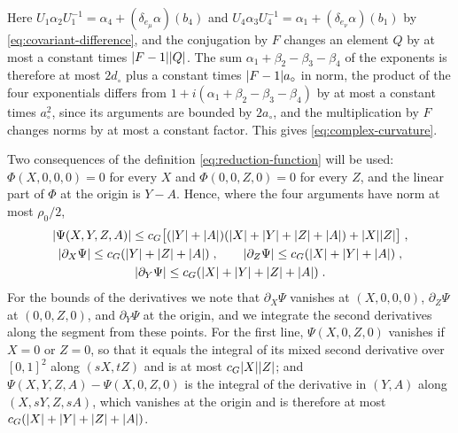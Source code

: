 Here $U_1\alpha_2U_1^{-1} = \alpha_4 + (\delta_{e_\mu}\alpha)(b_4)$ and $U_4\alpha_3U_4^{-1} = \alpha_1 + (\delta_{e_\nu}\alpha)(b_1)$ by \eqref{eq:covariant-difference}, and the conjugation by $F$ changes an element $Q$ by at most a constant times $\lvert F - 1\rvert\lvert Q\rvert$. The sum $\alpha_1 + \beta_2 - \beta_3 - \beta_4$ of the exponents is therefore at most $2d_\circ$ plus a constant times $\lvert F - 1\rvert a_\circ$ in norm, the product of the four exponentials differs from $1 + i(\alpha_1 + \beta_2 - \beta_3 - \beta_4)$ by at most a constant times $a_\circ^2$, since its arguments are bounded by $2a_\circ$, and the multiplication by $F$ changes norms by at most a constant factor. This gives \eqref{eq:complex-curvature}.

Two consequences of the definition \eqref{eq:reduction-function} will be used: $\Phi(X, 0, 0, 0) = 0$ for every $X$ and $\Phi(0, 0, Z, 0) = 0$ for every $Z$, and the linear part of $\Phi$ at the origin is $Y - A$. Hence, where the four arguments have norm at most $\rho_0/2$,
\begin{equation}\label{eq:reduction-remainder}
\begin{gathered}
    \lvert\Psi(X, Y, Z, A)\rvert \leq c_G\bigl[(\lvert Y\rvert + \lvert A\rvert)(\lvert X\rvert + \lvert Y\rvert + \lvert Z\rvert + \lvert A\rvert) + \lvert X\rvert\lvert Z\rvert\bigr]\;,\\
    \lvert\partial_X\Psi\rvert \leq c_G(\lvert Y\rvert + \lvert Z\rvert + \lvert A\rvert)\;,
    \qquad
    \lvert\partial_Z\Psi\rvert \leq c_G(\lvert X\rvert + \lvert Y\rvert + \lvert A\rvert)\;,\\
    \lvert\partial_Y\Psi\rvert \leq c_G(\lvert X\rvert + \lvert Y\rvert + \lvert Z\rvert + \lvert A\rvert)\;.
\end{gathered}
\end{equation}
For the bounds of the derivatives we note that $\partial_X\Psi$ vanishes at $(X, 0, 0, 0)$, $\partial_Z\Psi$ at $(0, 0, Z, 0)$, and $\partial_Y\Psi$ at the origin, and we integrate the second derivatives along the segment from these points. For the first line, $\Psi(X, 0, Z, 0)$ vanishes if $X = 0$ or $Z = 0$, so that it equals the integral of its mixed second derivative over $[0, 1]^2$ along $(sX, tZ)$ and is at most $c_G\lvert X\rvert\lvert Z\rvert$; and $\Psi(X, Y, Z, A) - \Psi(X, 0, Z, 0)$ is the integral of the derivative in $(Y, A)$ along $(X, sY, Z, sA)$, which vanishes at the origin and is therefore at most $c_G(\lvert X\rvert + \lvert Y\rvert + \lvert Z\rvert + \lvert A\rvert)$.

